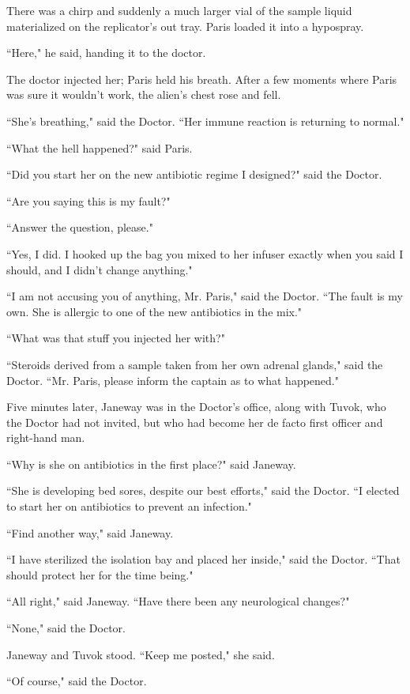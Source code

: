 \documentclass[twoside,letterpaper,12pt]{memoir}
\begin{document}
There was a chirp and suddenly a much larger vial of the sample liquid materialized on the replicator's out tray. Paris loaded it into a hypospray. 

``Here," he said, handing it to the doctor. 

The doctor injected her; Paris held his breath. After a few moments where Paris was sure it wouldn't work, the alien's chest rose and fell. 

``She's breathing," said the Doctor. ``Her immune reaction is returning to normal." 

``What the hell happened?" said Paris. 

``Did you start her on the new antibiotic regime I designed?" said the Doctor. 

``Are you saying this is my fault?" 

``Answer the question, please." 

``Yes, I did. I hooked up the bag you mixed to her infuser exactly when you said I should, and I didn't change anything." 

``I am not accusing you of anything, Mr. Paris," said the Doctor. ``The fault is my own. She is allergic to one of the new antibiotics in the mix." 

``What was that stuff you injected her with?" 

``Steroids derived from a sample taken from her own adrenal glands," said the Doctor. ``Mr. Paris, please inform the captain as to what happened." 

Five minutes later, Janeway was in the Doctor's office, along with Tuvok, who the Doctor had not invited, but who had become her de facto first officer and right-hand man.

``Why is she on antibiotics in the first place?" said Janeway. 

``She is developing bed sores, despite our best efforts," said the Doctor. ``I elected to start her on antibiotics to prevent an infection." 

``Find another way," said Janeway. 

``I have sterilized the isolation bay and placed her inside," said the Doctor. ``That should protect her for the time being." 

``All right," said Janeway. ``Have there been any neurological changes?" 

``None," said the Doctor. 

Janeway and Tuvok stood. ``Keep me posted," she said. 

``Of course," said the Doctor. 
\end{document}
